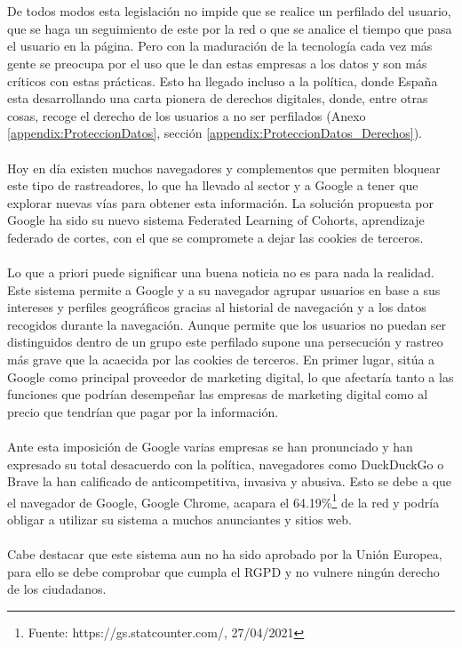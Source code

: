 \\ \\
De todos modos esta legislación no impide que se realice un perfilado del usuario, que se haga un seguimiento de este por la red o que se analice el tiempo que pasa el usuario en la página. Pero con la maduración de la tecnología cada vez más gente se preocupa por el uso que le dan estas empresas a los datos y son más críticos con estas prácticas. Esto ha llegado incluso a la política, donde España esta desarrollando una carta pionera de derechos digitales, donde, entre otras cosas, recoge el derecho de los usuarios a no ser perfilados (Anexo \ref{appendix:ProteccionDatos}, sección \ref{appendix:ProteccionDatos_Derechos}).
\\ \\
Hoy en día existen muchos navegadores y complementos que permiten bloquear este tipo de rastreadores, lo que ha llevado al sector y a Google a tener que explorar nuevas vías para obtener esta información. La solución propuesta por Google ha sido su nuevo sistema Federated Learning of Cohorts, aprendizaje federado de cortes, con el que se compromete a dejar las cookies de terceros.
\\ \\
Lo que a priori puede significar una buena noticia no es para nada la realidad. Este sistema permite a Google y a su navegador agrupar usuarios en base a sus intereses y perfiles geográficos gracias al historial de navegación y a los datos recogidos durante la navegación. Aunque permite que los usuarios no puedan ser distinguidos dentro de un grupo este perfilado supone una persecución y rastreo más grave que la acaecida por las cookies de terceros. En primer lugar, sitúa a Google como principal proveedor de marketing digital, lo que afectaría tanto a las funciones que podrían desempeñar las empresas de marketing digital como al precio que tendrían que pagar por la información.
\\ \\
Ante esta imposición de Google varias empresas se han pronunciado y han expresado su total desacuerdo con la política, navegadores como DuckDuckGo o Brave la han calificado de anticompetitiva, invasiva y abusiva. Esto se debe a que el navegador de Google, Google Chrome, acapara el 64.19\%\footnote{Fuente: https://gs.statcounter.com/, 27/04/2021} de la red y podría obligar a utilizar su sistema a muchos anunciantes y sitios web.
\\ \\  
Cabe destacar que este sistema aun no ha sido aprobado por la Unión Europea, para ello se debe comprobar que cumpla el RGPD y no vulnere ningún derecho de los ciudadanos.

